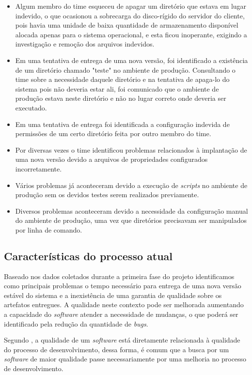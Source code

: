 \documentclass[
	12pt,				%
	openright,			%
	oneside,			%
	a4paper,			%
	english,			%
	french,				%
	spanish,			%
	brazil,				%
	]{abntex2}
\begin{document}
\begin{itemize}  
	\item Algum membro do time esqueceu de apagar um diretório que estava em lugar indevido, o que ocasionou a sobrecarga do disco-rígido do servidor do cliente, pois havia uma unidade de baixa quantidade de armazenamento disponível alocada apenas para o sistema operacional, e esta ficou inoperante, exigindo a investigação e remoção dos arquivos indevidos.
	\item Em uma tentativa de entrega de uma nova versão, foi identificado a existência de um diretório chamado "teste" no ambiente de produção. Consultando o time sobre a necessidade daquele diretório e na tentativa de apaga-lo do sistema pois não deveria estar ali, foi comunicado que o ambiente de produção estava neste diretório e não no lugar correto onde deveria ser executado.
	\item Em uma tentativa de entrega foi identificada a configuração indevida de permissões de um certo diretório feita por outro membro do time.
	\item Por diversas vezes o time identificou problemas relacionados à implantação de uma nova versão devido a arquivos de propriedades configurados incorretamente.
	\item Vários problemas já aconteceram devido a execução de \textit{scripts} no ambiente de produção sem os devidos testes serem realizados previamente.
	\item Diversos problemas aconteceram devido a necessidade da configuração manual do ambiente de produção, uma vez que diretórios precisavam ser manipulados por linha de comando.
\end{itemize}

\subsection{Características do processo atual} 

Baseado nos dados coletados durante a primeira fase do projeto identificamos como principais problemas o tempo necessário para entrega de uma nova versão estável do sistema e a inexistência de uma garantia de qualidade sobre os artefatos entregues. A qualidade neste contexto pode ser melhorada aumentando a capacidade do \textit{software} atender a necessidade de mudanças, o que poderá ser identificado pela redução da quantidade de \textit{bugs}.

Segundo , a qualidade de um \textit{software} está diretamente relacionada à qualidade do processo de desenvolvimento, dessa forma, é comum que a busca por um \textit{software} de maior qualidade passe necessariamente por uma melhoria no processo de desenvolvimento.
\end{document}
